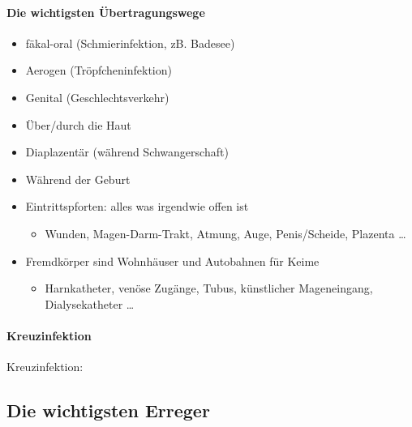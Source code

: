 \paragraph{Die wichtigsten
\"Ubertragungswege}
\begin{itemize}
    \item f\"akal-oral (Schmierinfektion, zB. Badesee)
    \item Aerogen (Tr\"opfcheninfektion)
    \item Genital (Geschlechtsverkehr)
    \item \"Uber/durch die Haut
    \item Diaplazent\"ar (w\"ahrend Schwangerschaft)
    \item W\"ahrend der Geburt
    \item Eintrittspforten: alles was irgendwie offen ist
    \begin{itemize}
        \item Wunden, Magen-Darm-Trakt, Atmung, Auge, Penis/Scheide, Plazenta
        \ldots
    \end{itemize}
    \item Fremdk\"orper sind Wohnh\"auser und Autobahnen f\"ur Keime
    \begin{itemize}
        \item Harnkatheter, ven\"ose Zug\"ange, Tubus, k\"unstlicher
        Mageneingang, Dialysekatheter {\dots}
    \end{itemize}
\end{itemize}
\paragraph[]{}
\paragraph[Kreuzinfektion]{Kreuzinfektion}

Kreuzinfektion: 

\subsection{Die wichtigsten Erreger}

